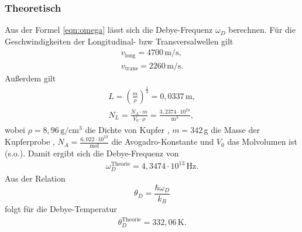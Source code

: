 \subsubsection{Theoretisch}
Aus der Formel \eqref{eqn:omega} lässt sich die Debye-Frequenz $\omega_D$ berechnen.
Für die Geschwindigkeiten der Longitudinal- bzw Transversalwellen gilt \cite{skript}
\begin{align*}
  v_{\text{long}} = 4700\,\text{m{/s}}, \\
  v_{\text{trans}} = 2260\,\text{m/s}.
\end{align*}
Außerdem gilt
\begin{gather*}
  L = \left({\frac{m}{\rho}}\right)^{\frac{1}{3}} = 0,0337\,\text{m}, \\
  N_L = \frac{N_A \cdot m}{V_0 \cdot \rho} = \frac{3,2374\cdot10^{24}}{\text{m}^3},
\end{gather*}
wobei $\rho = 8,96\, \text{g}/\text{cm}^3$ die Dichte von Kupfer \cite{cu}, $m = 342$\,g die Masse der Kupferprobe \cite{skript},
$N_A = \frac{6,022\cdot10^{23}}{\text{mol}}$ die Avogadro-Konstante \cite{dem} und $V_0$ das Molvolumen ist (s.o.).
Damit ergibt sich die Debye-Frequenz von
\begin{align*}
  \omega_D^{\text{Theorie}} = 4,3474\cdot10^{13}\,\text{Hz}.
\end{align*}
Aus der Relation
\begin{equation}
  \theta_D = \frac{\hbar\omega_D}{k_B}
\end{equation}
folgt für die Debye-Temperatur
\begin{align*}
  \theta_D^{\text{Theorie}} = 332,06\,\text{K}.
\end{align*}
